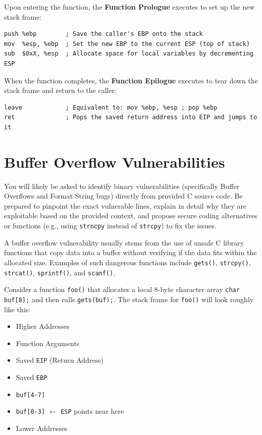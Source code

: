 Upon entering the function, the \textbf{Function Prologue} executes to set up the new stack frame:
\begin{verbatim}
push %ebp        ; Save the caller's EBP onto the stack
mov  %esp, %ebp  ; Set the new EBP to the current ESP (top of stack)
sub  $0xX, %esp  ; Allocate space for local variables by decrementing ESP
\end{verbatim}

When the function completes, the \textbf{Function Epilogue} executes to tear down the stack frame and return to the caller:
\begin{verbatim}
leave            ; Equivalent to: mov %ebp, %esp ; pop %ebp
ret              ; Pops the saved return address into EIP and jumps to it
\end{verbatim}

\section{Buffer Overflow Vulnerabilities}

\begin{tcolorbox}[colback=blue!5!white,colframe=blue!75!black,title=Exam Insight]
You will likely be asked to identify binary vulnerabilities (specifically Buffer Overflows and Format String bugs) directly from provided C source code. Be prepared to pinpoint the exact vulnerable lines, explain in detail why they are exploitable based on the provided context, and propose secure coding alternatives or functions (e.g., using \texttt{strncpy} instead of \texttt{strcpy}) to fix the issues.
\end{tcolorbox}

A buffer overflow vulnerability usually stems from the use of unsafe C library functions that copy data into a buffer without verifying if the data fits within the allocated size. Examples of such dangerous functions include \texttt{gets()}, \texttt{strcpy()}, \texttt{strcat()}, \texttt{sprintf()}, and \texttt{scanf()}.

Consider a function \texttt{foo()} that allocates a local 8-byte character array \texttt{char buf[8];} and then calls \texttt{gets(buf);}. The stack frame for \texttt{foo()} will look roughly like this:
\begin{itemize}
    \item Higher Addresses
    \item Function Arguments
    \item Saved \texttt{EIP} (Return Address)
    \item Saved \texttt{EBP}
    \item \texttt{buf[4-7]}
    \item \texttt{buf[0-3]} $\leftarrow$ \texttt{ESP} points near here
    \item Lower Addresses
\end{itemize}

